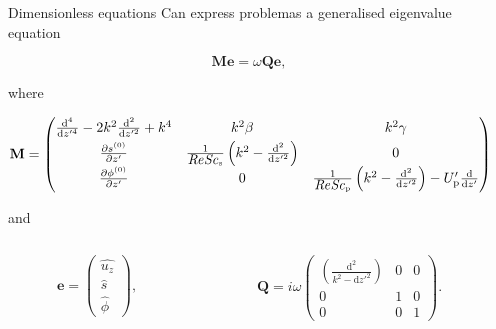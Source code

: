 \documentclass[final]{beamer} %
\newcommand\Rey{\mbox{\textit{Re}}}  %
\newcommand\Sc{\mbox{\textit{Sc}}}  %
\begin{document}
\begin{frame}[t]
\begin{columns}[t]
\begin{column}{0.26\paperwidth}
    \end{column}

    \begin{column}{0.34\paperwidth}
      \begin{block}{Dimensionless equations}
        Can express problemas a generalised eigenvalue equation
        
        $$\mathbf{M} \mathbf{e} = \omega \mathbf{Q} \mathbf{e}, $$

        where

        $$ \mathbf{M} = \begin{pmatrix}
          \frac{\mathrm{d}^{4}}{\mathrm{d} z'^{4}} - 2 k^{2} \frac{\mathrm{d}^{2}}{\mathrm{d} z'^{2}} + k^{4} &  k^{2} \beta & k^{2} \gamma \\[0.3em]
          \frac{\partial s^{(0)}}{\partial z'} & \frac{1}{\Rey \Sc_{\text{s}}} \left(k^{2} - \frac{\mathrm{d}^{2}}{\mathrm{d} z'^{2}} \right) & 0 \\[0.3em]
          \frac{\partial \phi^{(0)}}{\partial z'} & 0 & \frac{1}{\Rey \Sc_{\text{p}}} \left(k^{2} - \frac{\mathrm{d}^{2}}{\mathrm{d} z'^{2}} \right) - U_{\text{p}}' \frac{\mathrm{d}}{\mathrm{d} z'} 
        \end{pmatrix},$$

        and

        \begin{columns}[t]
          \begin{column}{0.17\paperwidth}
            $$\mathbf{e} = \begin{pmatrix}
              \hat{u_{z}} \\[0.3em]
              \hat{s} \\[0.3em]
              \hat{\phi}
            \end{pmatrix}, $$
          \end{column}

          \begin{column}{0.17\paperwidth}
            $$ \mathbf{Q} = i \omega \begin{pmatrix}
              \left(\frac{\mathrm{d}^{2}}{k^{2} - \mathrm{d} z'^{2}}\right) &  0 & 0 \\[0.3em]
              0 & 1 & 0 \\[0.3em]
              0 & 0 & 1
              \end{pmatrix}.$$
          \end{column}

        \end{columns}
      \end{block}


\end{column}
\end{columns}
\end{frame}
\end{document}
